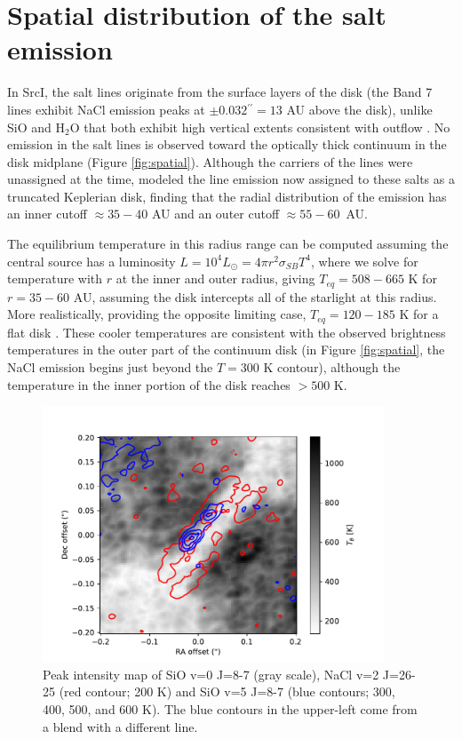 \documentclass[12pt]{article}
\newcommand\arcsec{\mbox{$^{\prime\prime}$}\xspace}
\newcommand{\sourcei}{SrcI\xspace}
\newcommand{\lsun}{\ensuremath{L_{\odot}}\xspace}			%
\newcommand{\water}{H$_{2}$O\xspace}		%
\begin{document}
\section*{Spatial distribution of the salt emission}
\label{sec:wherefrom}
In \sourcei, the salt lines originate from the surface layers of the disk (the Band 7
lines exhibit NaCl emission peaks at $\pm0.032\arcsec=13$ AU above the disk),
unlike SiO and \water that both exhibit high vertical extents consistent with
outflow \cite{Ginsburg2018b}.  No emission in the salt lines is observed
toward the optically thick continuum in the disk midplane (Figure
\ref{fig:spatial}).  Although the carriers of the lines were unassigned at the
time, \cite{Ginsburg2018b} modeled the line emission now assigned to these
salts as a
truncated Keplerian disk, finding that the radial distribution of the emission
has an inner cutoff $\approx35-40$ AU and an outer cutoff $\approx55-60$~AU.

The equilibrium temperature in this radius range can be computed assuming the central
source has a luminosity $L=10^4 \lsun = 4 \pi r^2 \sigma_{SB} T^4 $, where we
solve for temperature with $r$ at the inner and outer radius, giving $T_{eq} =
508-665$ K for $r=35-60$ AU, assuming the disk intercepts all of the starlight 
at this radius.  More realistically, providing the opposite limiting case,
$T_{eq}=120-185$ K for a flat disk \cite{Chiang1997a}.  These cooler temperatures
are consistent with the observed brightness temperatures in the outer
part of the continuum disk (in Figure \ref{fig:spatial}, the NaCl emission
begins just beyond the $T=300$ K contour), although the temperature in the inner
portion of the disk reaches $>500$ K.

\begin{figure}[!htp]
\includegraphics[scale=1,width=4in]{figures/SiO_8-7_on_NaClv=2_26-25.pdf}
\caption{Peak intensity map of SiO v=0 J=8-7 (gray scale), NaCl v=2 J=26-25
(red contour; 200 K) and {SiO v=5 J=8-7} (blue contours; 300, 400, 500, and 600
K).  The blue contours in the upper-left come from a blend with a different
line.
}
\label{fig:sioonnacl}
\end{figure}
\end{document}
